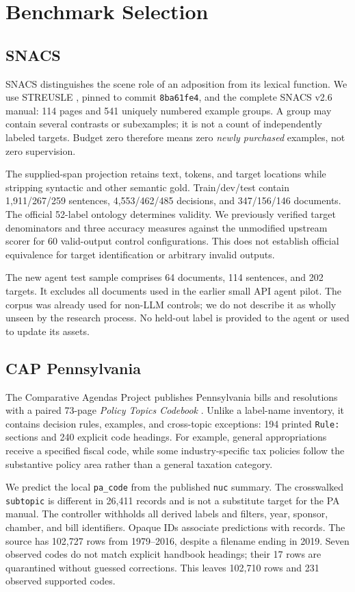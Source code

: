 \documentclass[11pt]{article}
\begin{document}
\section{Benchmark Selection}
\subsection{SNACS}
SNACS distinguishes the scene role of an adposition from its lexical function. We use STREUSLE \citep{streusle}, pinned to commit \texttt{8ba61fe4}, and the complete SNACS v2.6 manual: 114 pages and 541 uniquely numbered example groups. A group may contain several contrasts or subexamples; it is not a count of independently labeled targets. Budget zero therefore means zero \emph{newly purchased} examples, not zero supervision.

The supplied-span projection retains text, tokens, and target locations while stripping syntactic and other semantic gold. Train/dev/test contain 1,911/267/259 sentences, 4,553/462/485 decisions, and 347/156/146 documents. The official 52-label ontology determines validity. We previously verified target denominators and three accuracy measures against the unmodified upstream scorer for 60 valid-output control configurations. This does not establish official equivalence for target identification or arbitrary invalid outputs.

The new agent test sample comprises 64 documents, 114 sentences, and 202 targets. It excludes all documents used in the earlier small API agent pilot. The corpus was already used for non-LLM controls; we do not describe it as wholly unseen by the research process. No held-out label is provided to the agent or used to update its assets.

\subsection{CAP Pennsylvania}
The Comparative Agendas Project publishes Pennsylvania bills and resolutions with a paired 73-page \emph{Policy Topics Codebook} \citep{cappa}. Unlike a label-name inventory, it contains decision rules, examples, and cross-topic exceptions: 194 printed \texttt{Rule:} sections and 240 explicit code headings. For example, general appropriations receive a specified fiscal code, while some industry-specific tax policies follow the substantive policy area rather than a general taxation category.

We predict the local \texttt{pa\_code} from the published \texttt{nuc} summary. The crosswalked \texttt{subtopic} is different in 26,411 records and is not a substitute target for the PA manual. The controller withholds all derived labels and filters, year, sponsor, chamber, and bill identifiers. Opaque IDs associate predictions with records. The source has 102,727 rows from 1979--2016, despite a filename ending in 2019. Seven observed codes do not match explicit handbook headings; their 17 rows are quarantined without guessed corrections. This leaves 102,710 rows and 231 observed supported codes.
\end{document}

